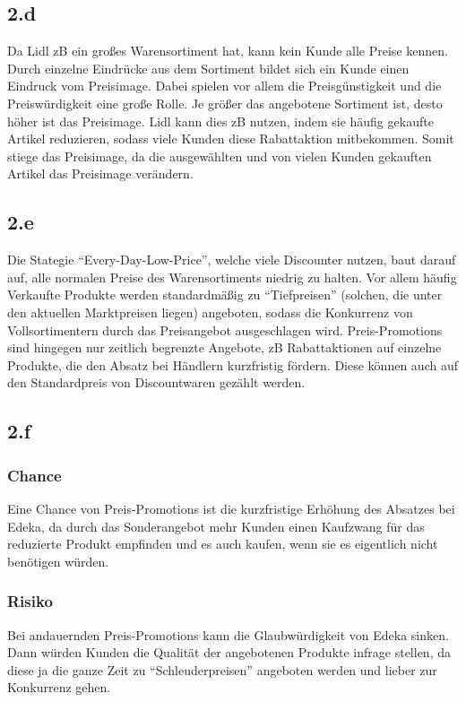 \documentclass{article}
\begin{document}
\subsection{2.d}
Da Lidl zB ein großes Warensortiment hat, kann kein Kunde alle Preise kennen. Durch einzelne Eindrücke aus dem Sortiment bildet sich ein Kunde einen Eindruck vom Preisimage. Dabei spielen vor allem die Preisgünstigkeit und die Preiswürdigkeit eine große Rolle. Je größer das angebotene Sortiment ist, desto höher ist das Preisimage.
Lidl kann dies zB nutzen, indem sie häufig gekaufte Artikel reduzieren, sodass viele Kunden diese Rabattaktion mitbekommen. Somit stiege das Preisimage, da die ausgewählten und von vielen Kunden gekauften Artikel das Preisimage verändern.

\subsection{2.e}
Die Stategie "`Every-Day-Low-Price"', welche viele Discounter nutzen, baut darauf auf, alle normalen Preise des Warensortiments niedrig zu halten. Vor allem häufig Verkaufte Produkte werden standardmäßig zu "`Tiefpreisen"' (solchen, die unter den aktuellen Marktpreisen liegen) angeboten, sodass die Konkurrenz von Vollsortimentern durch das Preisangebot ausgeschlagen wird.
Preis-Promotions sind hingegen nur zeitlich begrenzte Angebote, zB Rabattaktionen auf einzelne Produkte, die den Absatz bei Händlern kurzfristig fördern. Diese können auch auf den Standardpreis von Discountwaren gezählt werden.

\subsection{2.f}
\subsubsection{Chance}
Eine Chance von Preis-Promotions ist die kurzfristige Erhöhung des Absatzes bei Edeka, da durch das Sonderangebot mehr Kunden einen Kaufzwang für das reduzierte Produkt empfinden und es auch kaufen, wenn sie es eigentlich nicht benötigen würden.

\subsubsection{Risiko}
Bei andauernden Preis-Promotions kann die Glaubwürdigkeit von Edeka sinken. Dann würden Kunden die Qualität der angebotenen Produkte infrage stellen, da diese ja die ganze Zeit zu "`Schleuderpreisen"' angeboten werden und lieber zur Konkurrenz gehen.
\end{document}
